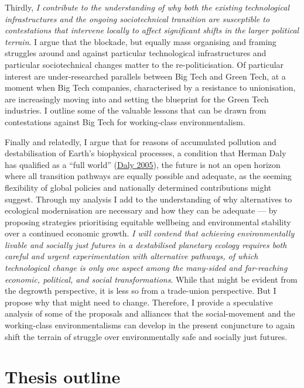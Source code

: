 \documentclass[a4paper, nobind]{templates/ociamthesis}
\begin{document}
Thirdly, \emph{I contribute to the understanding of why both the existing technological infrastructures and the ongoing sociotechnical transition are susceptible to contestations that intervene locally to affect significant shifts in the larger political terrain}. I argue that the blockade, but equally mass organising and framing struggles around and against particular technological infrastructures and particular sociotechnical changes matter to the re-politicisation. Of particular interest are under-researched parallels between Big Tech and Green Tech, at a moment when Big Tech companies, characterised by a resistance to unionisation, are increasingly moving into and setting the blueprint for the Green Tech industries. I outline some of the valuable lessons that can be drawn from contestations against Big Tech for working-class environmentalism.

Finally and relatedly, I argue that for reasons of accumulated pollution and destabilisation of Earth's biophysical processes, a condition that Herman Daly has qualified as a ``full world'' (\protect\hyperlink{ref-daly_economics_2005}{Daly 2005}), the future is not an open horizon where all transition pathways are equally possible and adequate, as the seeming flexibility of global policies and nationally determined contributions might suggest. Through my analysis I add to the understanding of why alternatives to ecological modernisation are necessary and how they can be adequate --- by proposing strategies prioritising equitable wellbeing and environmental stability over a continued economic growth. \emph{I will contend that achieving environmentally livable and socially just futures in a destabilised planetary ecology requires both careful and urgent experimentation with alternative pathways, of which technological change is only one aspect among the many-sided and far-reaching economic, political, and social transformations}. While that might be evident from the degrowth perspective, it is less so from a trade-union perspective. But I propose why that might need to change. Therefore, I provide a speculative analysis of some of the proposals and alliances that the social-movement and the working-class environmentalisms can develop in the present conjuncture to again shift the terrain of struggle over environmentally safe and socially just futures.

\hypertarget{thesis-outline}{%
\section{Thesis outline}\label{thesis-outline}}
\end{document}
